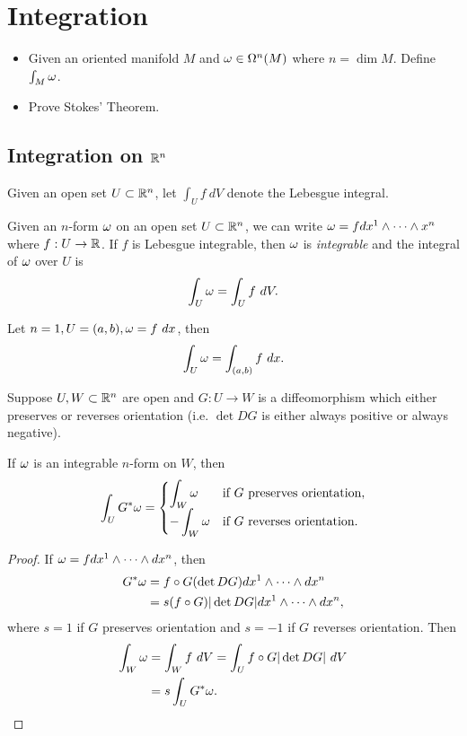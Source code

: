 \section{Integration}
\begin{itemize}
    \item Given an oriented manifold $M$ and $\omega \in \Omega^n(M)$ where $n = \dim M$. 
    Define $\int_M \omega$.
    \item Prove Stokes' Theorem. 
\end{itemize}
\subsection{Integration on $\mathbb{R}^n$}
Given an open set $U \subset \mathbb{R}^n$, let $\int_U f~dV$ denote the Lebesgue integral. 
\begin{definition}
    Given an $n$-form $\omega$ on an open set $U \subset \mathbb{R}^n$, we can write 
    $\omega = fdx^1 \wedge \cdots \wedge x^n$ where $f:U \to \mathbb{R}$. If $f$ is Lebesgue integrable, then $\omega$ is \textit{integrable} and the integral of $\omega$ over $U$ is 
    $$\int_U \omega = \int_U f~dV. $$
\end{definition}
\begin{example}
    Let $n=1, U = (a,b), \omega = f~dx$, then $$
    \int_U \omega = \int_{(a,b)}f~dx. $$
\end{example}
\begin{proposition}\label{16.1}
    Suppose $U, W \subset \mathbb{R}^n$ are open and $G:U \to W$ is a diffeomorphism which either preserves or reverses orientation (i.e. $\det DG$ is either always positive or always negative). 

    If $\omega$ is an integrable $n$-form on $W$, then $${\everymath{\displaystyle}
    \int_U G^*\omg = \begin{cases}
    \int_W \omg & \text{if }G \text{ preserves orientation}, \\
    -\int_W \omg & \text{if }G \text{ reverses orientation}. \end{cases} }$$
\end{proposition}
\begin{proof}
    If $\omega = fdx^1 \wedge \cdots \wedge dx^n$, then 
    \begin{align*}
    G^*\omega &= f \circ G (\det DG) dx^1 \wedge \cdots \wedge dx^n  \\
    &= s(f \circ G)|\det DG|dx^1 \wedge \cdots \wedge dx^n,
    \end{align*}
    where $s=1$ if $G$ preserves orientation and $s=-1$ if $G$ reverses orientation. 
    Then 
    \begin{align*}
    \int_W \omega &= \int_W f~dV 
    = \int_U f \circ G|\det DG| ~dV \\
    &= s \int_U G^* \omega.
    \end{align*}
\end{proof}
